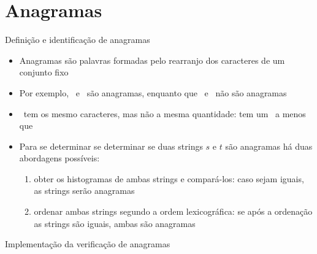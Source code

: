 \section{Anagramas}

\begin{frame}[fragile]{Definição e identificação de anagramas}

    \begin{itemize}
        \item Anagramas são palavras formadas pelo rearranjo dos caracteres de um conjunto fixo
        \pause

        \item Por exemplo, \  e \  são anagramas, enquanto que \  e \  não são anagramas
        \pause

        \item {}\  tem os mesmo caracteres, mas não a mesma quantidade: tem um \ a menos que 
        \pause

        \item Para se determinar se determinar se duas strings $s$ e $t$ são anagramas há duas abordagens possíveis:
        \pause
            \begin{enumerate}
                \item obter os histogramas de ambas strings e compará-los: caso sejam iguais, as strings serão anagramas
        \pause
                \item ordenar ambas strings segundo a ordem lexicográfica: se após a ordenação as strings são iguais, ambas são anagramas
            \end{enumerate}
    \end{itemize}

\end{frame}

\begin{frame}[fragile]{Implementação da verificação de anagramas}
\end{frame}

